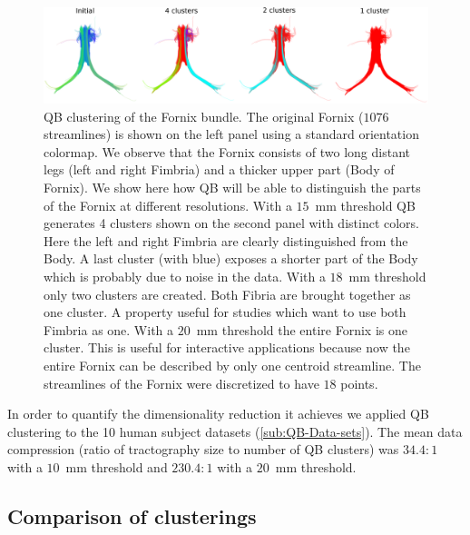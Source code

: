\documentclass{bioinfo}
\begin{document}
\begin{methods}
\begin{figure}[htp]
\centerline{\includegraphics[width=160mm]{Figures/Fig_6_QB_fornix}}
\caption{QB clustering of the Fornix bundle. The original Fornix ($1076$
  streamlines) is shown on the left panel using a standard orientation
  colormap. We observe that the Fornix consists of two long distant legs
  (left and right Fimbria) and a thicker upper part (Body of Fornix). We
  show here how QB will be able to distinguish the parts of the Fornix
  at different resolutions. With a $15$~mm threshold QB generates 4
  clusters shown on the second panel with distinct colors. Here the left
  and right Fimbria are clearly distinguished from the Body. A last
  cluster (with blue) exposes a shorter part of the Body which is
  probably due to noise in the data. With a $18$~mm threshold only two
  clusters are created. Both Fibria are brought together as one
  cluster. A property useful for studies which want to use both Fimbria
  as one. With a $20$~mm threshold the entire Fornix is one
  cluster. This is useful for interactive applications because now the
  entire Fornix can be described by only one centroid streamline. The
  streamlines of the Fornix were discretized to have $18$
  points.\label{Flo:QB_fornix}}
\end{figure}

In order to quantify the dimensionality reduction it achieves we applied
QB clustering to the 10 human subject datasets (\ref{sub:QB-Data-sets}). The mean
data compression (ratio of tractography size to number of QB clusters)
was $34.4:1$ with a $10$~mm threshold and $230.4:1$ with a $20$~mm
threshold.

\subsection{Comparison of clusterings\label{sub:Tightness-comparisons-1}}


\end{methods}
\end{document}
